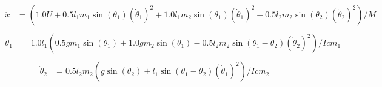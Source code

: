 \documentclass{article}%
\begin{document}
%
\begin{align*}%
\ddot{x} &= \displaystyle \left(1.0 U + 0.5 l_{1} m_{1} \sin(\theta_1 ) \left(\dot{\theta}_{1}\right)^{2} + 1.0 l_{1} m_{2} \sin(\theta_1 ) \left(\dot{\theta}_{1}\right)^{2} + 0.5 l_{2} m_{2} \sin(\theta_2 ) \left(\dot{\theta}_{2}\right)^{2}\right) / M \\%
\end{align*}%
\begin{align*}%
\ddot{\theta}_1 &= \displaystyle 1.0 l_{1} \left(0.5 g m_{1} \sin(\theta_1 ) + 1.0 g m_{2} \sin(\theta_1 ) - 0.5 l_{2} m_{2} \sin(\theta_1 - \theta_2 ) \left(\dot{\theta}_{2}\right)^{2}\right) / Icm_{1} \\%
\end{align*}%
\begin{align*}%
\ddot{\theta}_2 &= \displaystyle 0.5 l_{2} m_{2} \left(g \sin(\theta_2 ) + l_{1} \sin(\theta_1 - \theta_2 ) \left(\dot{\theta}_{1}\right)^{2}\right) / Icm_{2} \\%
\end{align*}

%
\end{document}
